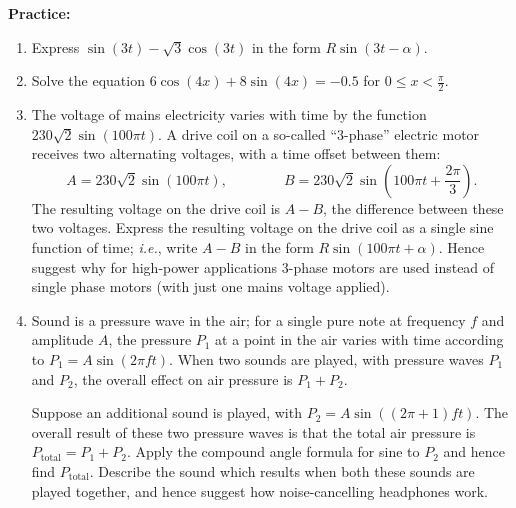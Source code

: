 \documentclass{article}
\begin{document}
\textbf{Practice:}

\vspace{5mm}


\begin{enumerate}
\item Express $\sin(3t)-\sqrt{3}\cos(3t)$ in the form $R\sin(3t-\alpha)$.
\item Solve the equation $6\cos(4x)+8\sin(4x) = -0.5$ for $0\leq x<\frac{\pi}{2}$.
\item The voltage of mains electricity varies with time by the function $230\sqrt{2}\sin(100\pi t)$. A drive coil on a so-called ``3-phase'' electric motor receives two alternating voltages, with a time offset between them:
\[A=230\sqrt{2}\sin(100\pi t),\qquad\qquad B=230\sqrt{2}\sin\left(100\pi t+\frac{2\pi}{3}\right).\]
The resulting voltage on the drive coil is $A-B$, the difference between these two voltages. Express the resulting voltage on the drive coil as a single sine function of time; \textit{i.e.}, write $A-B$ in the form $R\sin(100\pi t+\alpha)$. Hence suggest why for high-power applications 3-phase motors are used instead of single phase motors (with just one mains voltage applied).
\item Sound is a pressure wave in the air; for a single pure note at frequency $f$ and amplitude $A$, the pressure $P_1$ at a point in the air varies with time according to $P_1=A\sin(2\pi f t)$. When two sounds are played, with pressure waves $P_1$ and $P_2$, the overall effect on air pressure is $P_1+P_2$.

Suppose an additional sound is played, with $P_2=A\sin\left((2\pi+1) ft\right)$. The overall result of these two pressure waves is that the total air pressure is $P_{\mathrm{total}}=P_1+P_2$. Apply the compound angle formula for sine to $P_2$ and hence find $P_\mathrm{total}$. Describe the sound which results when both these sounds are played together, and hence suggest how noise-cancelling headphones work.
\end{enumerate}
\end{document}
